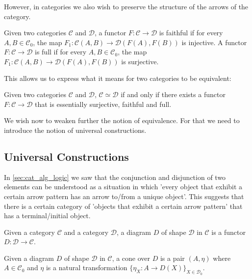 However, in categories we also wish to preserve the structure of 
the arrows of the category.
\begin{definition}
    Given two categories $\mathcal{C}$ and $\mathcal{D}$,
    a functor $F:\mathcal{C}\to\mathcal{D}$ is faithful if for every $A,B\in\mathcal{C}_0$,
    the map $F_1:\mathcal{C}(A,B)\to\mathcal{D}(F(A),F(B))$ is injective.
    A functor $F:\mathcal{C}\to\mathcal{D}$ is full if for every $A,B\in\mathcal{C}_0$,
    the map $F_1:\mathcal{C}(A,B)\to\mathcal{D}(F(A),F(B))$ is surjective.
\end{definition}

This allows us to express what it means for two categories to be equivalent:
\begin{lemma}
    Given two categories $\mathcal{C}$ and $\mathcal{D}$,
    $\mathcal{C}\simeq\mathcal{D}$ if and only if there exists a functor 
    $F:\mathcal{C}\to\mathcal{D}$
    that is essentially surjective, faithful and full.
\end{lemma}

We wish now to weaken further the notion of equivalence.
For that we need to introduce the notion of universal constructions.

\subsection{Universal Constructions}
In \ref{sec:cat_alg_logic} we saw that the conjunction and 
disjunction of two elements
can be understood as a situation in which 'every object that exhibit a
certain arrow pattern has an arrow to/from a unique object'.
This suggests that there is a certain category of
'objects that exhibit a certain arrow pattern' 
that has a terminal/initial object.

\begin{definition}[Diagram]
    Given a category $\mathcal{C}$ and a category
    $\mathcal{D}$, a diagram $D$ of 
    shape $\mathcal{D}$ in $\mathcal{C}$
    is a functor $D:\mathcal{D}\to\mathcal{C}$.
\end{definition}

\begin{definition}[Cone]
    Given a diagram $D$ of shape $\mathcal{D}$ in $\mathcal{C}$,
    a cone over $D$ is a pair $(A,\eta)$ where $A\in\mathcal{C}_0$
    and $\eta$ is a 
    natural transformation $\{\eta_X:A\to D(X)\}_{X\in\mathcal{D}_0}$.
\end{definition}

